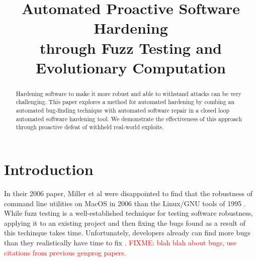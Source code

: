 \documentclass[conference]{IEEEtran}
\newcommand{\FIXME}[1]{\textcolor{red}{FIXME: #1}}
\begin{document}
\title{Automated Proactive Software Hardening\\ through Fuzz Testing and Evolutionary Computation}

\author{}

\maketitle

\begin{abstract}
Hardening software to make it more robust and able to withstand attacks can be
very challenging.  This paper explores a method for automated hardening by
combing an automated bug-finding technique with automated software
repair in a closed loop automated software hardening tool.  We
demonstrate the effectiveness of this approach through proactive
defeat of withheld real-world exploits.
\end{abstract}

\section{Introduction}
In their 2006 paper, Miller et al were disappointed to find that the robustness
of command line utilities on MacOS in 2006 than the Linux/GNU tools of 1995
\cite{Miller2006}.  While fuzz testing is a well-established technique for
testing software robustness, applying it to an existing project and then fixing
the bugs found as a result of this techinque takes time.  Unfortunately,
developers already can find more bugs than they realistically have time to fix
\cite{devshavetoomanybugs}.  \FIXME{blah blah about bugs, use citations from
previous genprog papers.}
\end{document}

